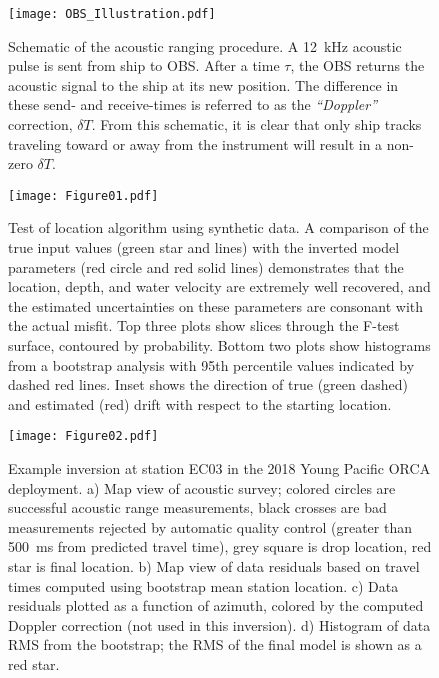 \begin{figure}[h]
\texttt{[image: OBS\_Illustration.pdf]}
\caption{Schematic of the acoustic ranging procedure. A 12~kHz acoustic pulse is sent from ship to OBS. After a time $\tau$, the OBS returns the acoustic signal to the ship at its new position. The difference in these send- and receive-times is referred to as the \textit{``Doppler''} correction, $\delta T$. From this schematic, it is clear that only ship tracks traveling toward or away from the instrument will result in a non-zero $\delta T$.}
\label{fig:cartoon}
\end{figure}

\newpage

\begin{figure}[h]
\texttt{[image: Figure01.pdf]}
\caption{Test of location algorithm using synthetic data. A comparison of the true input values (green star and lines) with the inverted model parameters (red circle and red solid lines) demonstrates that the location, depth, and water velocity are extremely well recovered, and the estimated uncertainties on these parameters are consonant with the actual misfit. Top three plots show slices through the F-test surface, contoured by probability. Bottom two plots show histograms from a bootstrap analysis with 95th percentile values indicated by dashed red lines. Inset shows the direction of true (green dashed) and estimated (red) drift with respect to the starting location. }
\label{fig:one_sta_synth}
\end{figure}

\newpage

\begin{figure}[h]
\texttt{[image: Figure02.pdf]}
\caption{Example inversion at station EC03 in the 2018 Young Pacific ORCA deployment. a) Map view of acoustic survey; colored circles are successful acoustic range measurements, black crosses are bad measurements rejected by automatic quality control (greater than 500~ms from predicted travel time), grey square is drop location, red star is final location. b) Map view of data residuals based on travel times computed using bootstrap mean station location. c) Data residuals plotted as a function of azimuth, colored by the computed Doppler correction (not used in this inversion). d) Histogram of data RMS from the bootstrap; the RMS of the final model is shown as a red star.}
\label{fig:one_sta_real_survey}
\end{figure}

